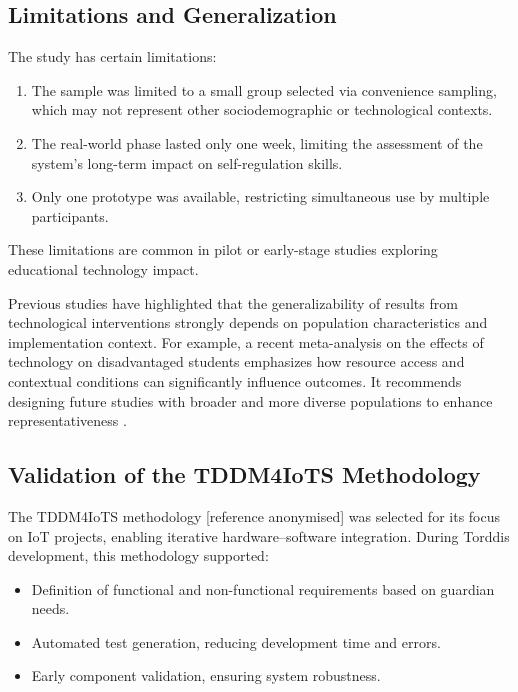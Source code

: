                 \subsection{Limitations and Generalization}
                The study has certain limitations:
                
                \begin{enumerate}
                    \item The sample was limited to a small group selected via convenience sampling, which may not represent other sociodemographic or technological contexts.
                    
                    \item The real-world phase lasted only one week, limiting the assessment of the system’s long-term impact on self-regulation skills.
                    
                    \item Only one prototype was available, restricting simultaneous use by multiple participants.
                \end{enumerate}
                
                These limitations are common in pilot or early-stage studies exploring educational technology impact.
                
                Previous studies have highlighted that the generalizability of results from technological interventions strongly depends on population characteristics and implementation context. For example, a recent meta-analysis on the effects of technology on disadvantaged students emphasizes how resource access and contextual conditions can significantly influence outcomes. It recommends designing future studies with broader and more diverse populations to enhance representativeness \citep{DiPietro2025Meta}.
                
                \subsection{Validation of the TDDM4IoTS Methodology}
                The TDDM4IoTS methodology [reference anonymised] was selected for its focus on IoT projects, enabling iterative hardware–software integration. During Torddis development, this methodology supported:
                
                \begin{itemize}
                    \item Definition of functional and non-functional requirements based on guardian needs.
                    
                    \item Automated test generation, reducing development time and errors.
                    
                    \item Early component validation, ensuring system robustness.
                \end{itemize}
                
